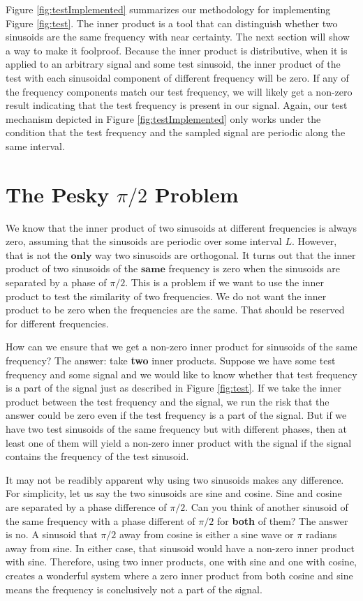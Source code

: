 Figure \ref{fig:testImplemented} summarizes our methodology for implementing Figure \ref{fig:test}.  The inner
product is a tool that can distinguish whether two sinusoids are the same frequency with near certainty.  The next
section will show a way to make it foolproof.  Because the inner product is distributive, when it is applied to an
arbitrary signal and some test sinusoid, the inner product of the test with each sinusoidal component of different
frequency will be zero.  If any of the frequency components match our test frequency,  we will likely get a non-zero
result indicating that the test frequency is present in our signal.  Again, our test mechanism depicted in 
Figure \ref{fig:testImplemented} only works under the condition that the test frequency and the sampled signal
are periodic along the same interval.  

\section*{The Pesky $\pi/2$ Problem}

We know that the inner product of two sinusoids at different frequencies is always zero, assuming that the
sinusoids are periodic over some interval $L$.  However, that is not the $\textbf{only}$ way two sinusoids are
orthogonal.  It turns out that the inner product of two sinusoids of the $\textbf{same}$ frequency is zero when 
the sinusoids are separated by a phase of $\pi/2$.  This is a problem if we want to use the inner product to
test the similarity of two frequencies.  We do not want the inner product to be zero when the frequencies are the
same.  That should be reserved for different frequencies. 

How can we ensure that we get a non-zero inner product for sinusoids of the same frequency?  The answer:
take \textbf{two} inner products.  Suppose we have some test frequency and some signal and we would like to 
know whether that test frequency is a part of the signal just as described in Figure \ref{fig:test}.  If we take
the inner product between the test frequency and the signal, we run the risk that the answer could be zero even
if the test frequency is a part of the signal.  But if we have two test sinusoids of the same frequency but with
different phases, then at least one of them will yield a non-zero inner product with the signal if the signal 
contains the frequency of the test sinusoid.  

It may not be readibly apparent why using two sinusoids makes any difference.  For simplicity, let us say the
two sinusoids are sine and cosine.  Sine and cosine are separated by a phase difference of $\pi/2$.  Can you
think of another sinusoid of the same frequency with a phase different of $\pi/2$ for \textbf{both} of them?
The answer is no.  A sinusoid that $\pi/2$ away from cosine is either a sine wave or $\pi$ radians away from
sine.  In either case, that sinusoid would have a non-zero inner product with sine.  Therefore, using two inner
products, one with sine and one with cosine, creates a wonderful system where a zero inner product from both
cosine and sine means the frequency is conclusively not a part of the signal.

